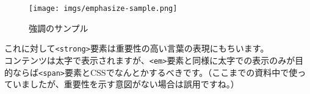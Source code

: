 \begin{Shaded}
\begin{Highlighting}[]
\DataTypeTok{\textless{}}\DataTypeTok{\textgreater{}}
  \DataTypeTok{\textless{}}\DataTypeTok{\textgreater{}}
    \DataTypeTok{\textless{}}\DataTypeTok{\textgreater{}}\DataTypeTok{\textless{}}\DataTypeTok{\textgreater{}}\DataTypeTok{\textless{}/}\DataTypeTok{\textgreater{}}\DataTypeTok{\textless{}/}\DataTypeTok{\textgreater{}}
    \DataTypeTok{\textless{}}\DataTypeTok{\textgreater{}}\DataTypeTok{\textless{}}\DataTypeTok{\textgreater{}}\DataTypeTok{\textless{}/}\DataTypeTok{\textgreater{}}\DataTypeTok{\textless{}/}\DataTypeTok{\textgreater{}}
    \DataTypeTok{\textless{}}\DataTypeTok{\textgreater{}}\DataTypeTok{\textless{}}\DataTypeTok{\textgreater{}}\DataTypeTok{\textless{}/}\DataTypeTok{\textgreater{}}\DataTypeTok{\textless{}/}\DataTypeTok{\textgreater{}}
  \DataTypeTok{\textless{}/}\DataTypeTok{\textgreater{}}
\DataTypeTok{\textless{}/}\DataTypeTok{\textgreater{}}
\end{Highlighting}
\end{Shaded}

\begin{figure}
\centering
\texttt{[image: imgs/emphasize-sample.png]}
\caption{強調のサンプル}
\end{figure}

これに対して\texttt{\textless{}strong\textgreater{}}要素は重要性の高い言葉の表現にもちいます。\\
コンテンツは太字で表示されますが、\texttt{\textless{}em\textgreater{}}要素と同様に太字での表示のみが目的ならば\texttt{\textless{}span\textgreater{}}要素とCSSでなんとかするべきです。（ここまでの資料中で使っていましたが、重要性を示す意図がない場合は誤用ですね。）

